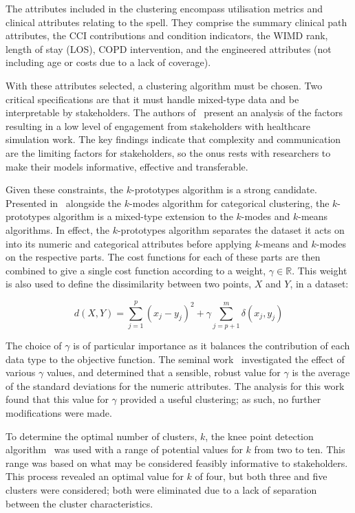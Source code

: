 \documentclass[]{interact}
\theoremstyle{plain}%
\theoremstyle{definition}
\theoremstyle{remark}
\begin{document}
The attributes included in the clustering encompass utilisation metrics and
clinical attributes relating to the spell. They comprise the summary clinical
path attributes, the CCI contributions and condition indicators, the WIMD rank,
length of stay (LOS), COPD intervention, and the engineered attributes (not
including age or costs due to a lack of coverage).

With these attributes selected, a clustering algorithm must be chosen. Two
critical specifications are that it must handle mixed-type data and be
interpretable by stakeholders. The authors of~\cite{Jahangirian2015} present an
analysis of the factors resulting in a low level of engagement from stakeholders
with healthcare simulation work. The key findings indicate that complexity and
communication are the limiting factors for stakeholders, so the onus rests with
researchers to make their models informative, effective and transferable.

Given these constraints, the \(k\)-prototypes algorithm is a strong candidate.
Presented in~\cite{Huang1997a} alongside the \(k\)-modes algorithm for
categorical clustering, the \(k\)-prototypes algorithm is a mixed-type
extension to the \(k\)-modes and \(k\)-means algorithms. In effect, the
\(k\)-prototypes algorithm separates the dataset it acts on into its numeric and
categorical attributes before applying \(k\)-means and \(k\)-modes on the
respective parts. The cost functions for each of these parts are then combined
to give a single cost function according to a weight, \(\gamma \in \mathbb R\).
This weight is also used to define the dissimilarity between two points, \(X\)
and \(Y\), in a dataset:

\begin{equation}\label{eq:kprototypes}
    d(X, Y) = \sum_{j=1}^{p} \left(x_j - y_j\right)^2 + \gamma \sum_{j=p+1}^{m}
    \delta \left(x_j, y_j\right)
\end{equation}

The choice of \(\gamma\) is of particular importance as it balances the
contribution of each data type to the objective function. The seminal
work~\cite{Huang1997a} investigated the effect of various \(\gamma\) values, and
determined that a sensible, robust value for \(\gamma\) is the average of the
standard deviations for the numeric attributes. The analysis for this work found
that this value for \(\gamma\) provided a useful clustering; as such, no further
modifications were made.

To determine the optimal number of clusters, \(k\), the knee point detection
algorithm~\cite{Satopaa2011} was used with a range of potential values for \(k\)
from two to ten. This range was based on what may be considered feasibly
informative to stakeholders. This process revealed an optimal value for \(k\) of
four, but both three and five clusters were considered; both were eliminated due
to a lack of separation between the cluster characteristics.
\end{document}
